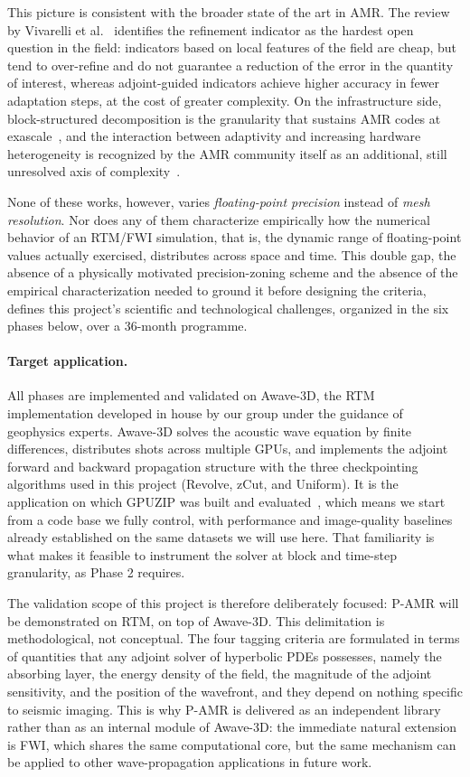 \documentclass[12pt,a4paper]{article}
\newcommand{\pamr}{P\nobreakdash-AMR}
\begin{document}
This picture is consistent with the broader state of the art in AMR. The
review by Vivarelli et al.~\cite{vivarelli2025review} identifies the
refinement indicator as the hardest open question in the field: indicators
based on local features of the field are cheap, but tend to over-refine and
do not guarantee a reduction of the error in the quantity of interest,
whereas adjoint-guided indicators achieve higher accuracy in fewer
adaptation steps, at the cost of greater complexity. On the infrastructure
side, block-structured decomposition is the granularity that sustains AMR
codes at exascale~\cite{zhang2021amrex}, and the interaction between
adaptivity and increasing hardware heterogeneity is recognized by the AMR
community itself as an additional, still unresolved axis of
complexity~\cite{dubey2021portability}.

None of these works, however, varies \emph{floating-point precision}
instead of \emph{mesh resolution}. Nor does any of them characterize
empirically how the
numerical behavior of an RTM/FWI simulation, that is, the dynamic range of
floating-point values actually exercised, distributes across space and
time. This double gap, the absence of a physically motivated
precision-zoning scheme and the absence of the empirical characterization
needed to ground it before designing the criteria, defines this project's
scientific and technological challenges, organized in the six phases
below, over a 36-month programme.

\paragraph{Target application.} All phases are implemented and validated on
Awave-3D, the RTM implementation developed in house by our group under the
guidance of geophysics experts. Awave-3D solves the acoustic wave equation
by finite differences, distributes shots across multiple GPUs, and
implements the adjoint forward and backward propagation structure with the
three checkpointing algorithms used in this project (Revolve, zCut, and
Uniform). It is the application on which GPUZIP was built and
evaluated~\cite{maltempi2025checkpointing}, which means we start from a code
base we fully control, with performance and image-quality baselines already
established on the same datasets we will use here. That familiarity is what
makes it feasible to instrument the solver at block and time-step
granularity, as Phase 2 requires.

The validation scope of this project is therefore deliberately focused:
\pamr{} will be demonstrated on RTM, on top of Awave-3D. This delimitation
is methodological, not conceptual. The four tagging criteria are formulated
in terms of quantities that any adjoint solver of hyperbolic PDEs
possesses, namely the absorbing layer, the energy density of the field, the
magnitude of the adjoint sensitivity, and the position of the wavefront,
and they depend on nothing specific to seismic imaging. This is why
\pamr{} is delivered as an independent library rather than as an internal
module of Awave-3D: the immediate natural extension is FWI, which shares
the same computational core, but the same mechanism can be applied to other
wave-propagation applications in future work.
\end{document}
